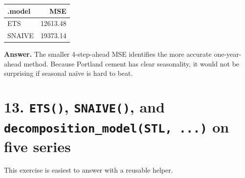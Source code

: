 \documentclass[
  11pt,
]{article}
\newcounter{none} %
\begin{document}
{\def\LTcaptype{none} %
\begin{longtable}[]{@{}lr@{}}
\toprule\noalign{}
.model & MSE \\
\midrule\noalign{}
\endhead
\bottomrule\noalign{}
\endlastfoot
ETS & 12613.48 \\
SNAIVE & 19373.14 \\
\end{longtable}
}

\textbf{Answer.} The smaller 4-step-ahead MSE identifies the more
accurate one-year-ahead method. Because Portland cement has clear
seasonality, it would not be surprising if seasonal naïve is hard to
beat.

\section{\texorpdfstring{13. \texttt{ETS()}, \texttt{SNAIVE()}, and
\texttt{decomposition\_model(STL,\ ...)} on five
series}{13. ETS(), SNAIVE(), and decomposition\_model(STL, ...) on five series}}\label{ets-snaive-and-decomposition_modelstl-...-on-five-series}

This exercise is easiest to answer with a reusable helper.
\end{document}
